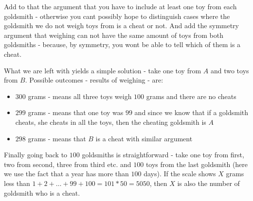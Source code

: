 \begin{problem}
Add to that the argument that you have to include at least one toy from each goldsmith - otherwise you cant possibly hope to distinguish cases where the goldsmith we do not weigh toys from is a cheat or not. And add the symmetry argument that weighing can not have the same amount of toys from both goldsmiths - because, by symmetry, you wont be able to tell which of them is a cheat. 

What we are left with yields a simple solution - take one toy from $A$ and two toys from $B$. Possible outcomes - results of weighing - are:
\begin{itemize}
\item $300$ grams - means all three toys weigh $100$ grams and there are no cheats
\item $299$ grams - means that one toy was $99$ and since we know that if a goldsmith cheats, she cheats in all the toys, then the cheating goldsmith is $A$
\item $298$ grams - means that $B$ is a cheat with similar argument
\end{itemize}

Finally going back to $100$ goldsmiths is straightforward - take one toy from first, two from second, three from third etc. and $100$ toys from the last goldsmith (here we use the fact that a year has more than $100$ days). If the scale shows $X$ grams less than $1+2+\dots+99+100=101*50=5050$, then $X$ is also the number of goldsmith who is a cheat.

\end{problem}
%
\filbreak
